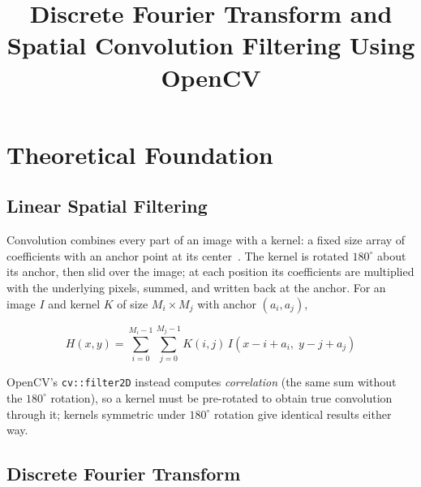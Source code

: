 \documentclass[conference]{IEEEtran}
\begin{document}
\raggedbottom

\title{Discrete Fourier Transform and Spatial Convolution Filtering Using OpenCV\\
}

\author{
}

\maketitle

\section{Theoretical Foundation}

\subsection{Linear Spatial Filtering}
\label{sec:theory-conv}

Convolution combines every part of an image with a kernel: a fixed
size array of coefficients with an anchor point at its
center~\cite{opencv-filter2d}. The kernel is rotated $180^\circ$
about its anchor, then slid over the image; at each position its
coefficients are multiplied with the underlying pixels, summed, and
written back at the anchor. For an image $I$ and kernel $K$ of size
$M_i \times M_j$ with anchor $(a_i, a_j)$,

\begin{equation}
    H(x, y) = \sum_{i=0}^{M_i - 1} \sum_{j=0}^{M_j - 1}
    K(i, j)\, I(x - i + a_i,\; y - j + a_j)
    \label{eq:convolution}
\end{equation}

\noindent OpenCV's \texttt{cv::filter2D} instead computes
\emph{correlation} (the same sum without the $180^\circ$ rotation), so
a kernel must be pre-rotated to obtain true convolution through it;
kernels symmetric under $180^\circ$ rotation give identical results
either way.

\subsection{Discrete Fourier Transform}
\label{sec:theory-dft}
\end{document}
